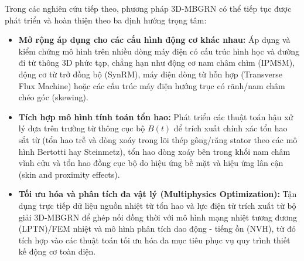 Trong các nghiên cứu tiếp theo, phương pháp 3D-MBGRN có thể tiếp tục được phát triển và hoàn thiện theo ba định hướng trọng tâm:
\begin{itemize}
    \item \textbf{Mở rộng áp dụng cho các cấu hình động cơ khác nhau:} Áp dụng và kiểm chứng mô hình trên nhiều dòng máy điện có cấu trúc hình học và đường đi từ thông 3D phức tạp, chẳng hạn như động cơ nam châm chìm (IPMSM), động cơ từ trở đồng bộ (SynRM), máy điện dòng từ hỗn hợp (Transverse Flux Machine) hoặc các cấu trúc máy điện hướng trục có rãnh/nam châm chéo góc (skewing).
    \item \textbf{Tích hợp mô hình tính toán tổn hao:} Phát triển các thuật toán hậu xử lý dựa trên trường từ thông cục bộ $B(t)$ để trích xuất chính xác tổn hao sắt từ (tổn hao trễ và dòng xoáy trong lõi thép gông/răng stator theo các mô hình Bertotti hay Steinmetz), tổn hao dòng xoáy bên trong khối nam châm vĩnh cửu và tổn hao đồng cục bộ do hiệu ứng bề mặt và hiệu ứng lân cận (skin and proximity effects).
    \item \textbf{Tối ưu hóa và phân tích đa vật lý (Multiphysics Optimization):} Tận dụng trực tiếp dữ liệu nguồn nhiệt từ tổn hao và lực điện từ trích xuất từ bộ giải 3D-MBGRN để ghép nối đồng thời với mô hình mạng nhiệt tương đương (LPTN)/FEM nhiệt và mô hình phân tích dao động - tiếng ồn (NVH), từ đó tích hợp vào các thuật toán tối ưu hóa đa mục tiêu phục vụ quy trình thiết kế động cơ toàn diện.
\end{itemize}